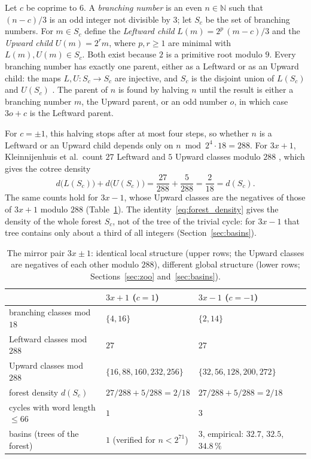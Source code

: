 \documentclass[12pt]{amsart}
\theoremstyle{definition}
\theoremstyle{remark}
\newcommand{\N}{\mathbb{N}}
\begin{document}
Let $c$ be coprime to $6$. A \emph{branching number} is an even $n\in\N$ such that $(n-c)/3$ is an odd integer not divisible by $3$; let $S_c$ be the set of branching numbers. For $m\in S_c$ define the \emph{Leftward child} $L(m)=2^p\,(m-c)/3$ and the \emph{Upward child} $U(m)=2^r m$, where $p,r\ge1$ are minimal with $L(m),U(m)\in S_c$. Both exist because $2$ is a primitive root modulo $9$. Every branching number has exactly one parent, either as a Leftward or as an Upward child: the maps $L,U:S_c\to S_c$ are injective, and $S_c$ is the disjoint union of $L(S_c)$ and $U(S_c)$ \cite{Sultanow_graph_2020,Kleinnijenhuis_2026}. The parent of $n$ is found by halving $n$ until the result is either a branching number $m$, the Upward parent, or an odd number $o$, in which case $3o+c$ is the Leftward parent.

For $c=\pm1$, this halving stops after at most four steps, so whether $n$ is a Leftward or an Upward child depends only on $n\bmod 2^4\cdot18=288$. For $3x+1$, Kleinnijenhuis et al.\ count $27$ Leftward and $5$ Upward classes modulo $288$ \cite[(3.73), (3.79)]{Kleinnijenhuis_2026}, which gives the cotree density
\begin{equation}
\label{eq:forest_density}
d\bigl(L(S_c)\bigr)+d\bigl(U(S_c)\bigr)=\frac{27}{288}+\frac{5}{288}=\frac{2}{18}=d(S_c).
\end{equation}
The same counts hold for $3x-1$, whose Upward classes are the negatives of those of $3x+1$ modulo $288$ (Table~\ref{table:mirror}). The identity~\eqref{eq:forest_density} gives the density of the whole forest $S_c$, not of the tree of the trivial cycle: for $3x-1$ that tree contains only about a third of all integers (Section~\ref{sec:basins}).

\begin{table}[H]
\centering
\small
\begin{tabular}{lll}
\toprule
 & $3x+1$ ($c=1$) & $3x-1$ ($c=-1$) \\
\midrule
branching classes mod $18$ & $\{4,16\}$ & $\{2,14\}$ \\
Leftward classes mod $288$ & $27$ & $27$ \\
Upward classes mod $288$ & $\{16,88,160,232,256\}$ & $\{32,56,128,200,272\}$ \\
forest density $d(S_c)$ & $27/288+5/288=2/18$ & $27/288+5/288=2/18$ \\
cycles with word length $\le 66$ & $1$ & $3$ \\
basins (trees of the forest) & $1$ (verified for $n<2^{71}$) & $3$, empirical: $32.7$, $32.5$, $34.8\,\%$ \\
\bottomrule
\end{tabular}
\caption{The mirror pair $3x\pm1$: identical local structure (upper rows; the Upward classes are negatives of each other modulo $288$), different global structure (lower rows; Sections~\ref{sec:zoo} and~\ref{sec:basins}).}
\label{table:mirror}
\end{table}
\end{document}
